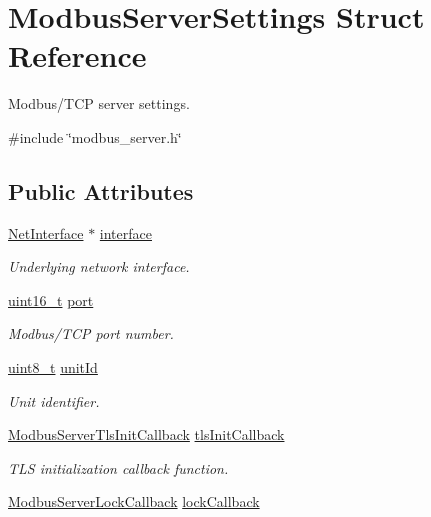 \hypertarget{structModbusServerSettings}{}\section{Modbus\+Server\+Settings Struct Reference}
\label{structModbusServerSettings}


Modbus/\+T\+CP server settings.  




{\ttfamily \#include \char`\"{}modbus\+\_\+server.\+h\char`\"{}}

\subsection*{Public Attributes}
\begin{DoxyCompactItemize}
\item 
\hyperlink{net_8h_a2234db8911a1148c9159979d8f5e0d6b}{Net\+Interface} $\ast$ \hyperlink{structModbusServerSettings_a8a5b5283989b576e26a24e970b70eb32}{interface}
\begin{DoxyCompactList}\small\item\em Underlying network interface. \end{DoxyCompactList}\item 
\hyperlink{stdint_8h_a273cf69d639a59973b6019625df33e30}{uint16\+\_\+t} \hyperlink{structModbusServerSettings_a0da7876580b2d9302e1d3a3b85ec9060}{port}
\begin{DoxyCompactList}\small\item\em Modbus/\+T\+CP port number. \end{DoxyCompactList}\item 
\hyperlink{stdint_8h_aba7bc1797add20fe3efdf37ced1182c5}{uint8\+\_\+t} \hyperlink{structModbusServerSettings_ad120c4c503d9d0a0c696393b6d1dd0c4}{unit\+Id}
\begin{DoxyCompactList}\small\item\em Unit identifier. \end{DoxyCompactList}\item 
\hyperlink{modbus__server_8h_adc1985b28525307a7cd3eeb66f61c949}{Modbus\+Server\+Tls\+Init\+Callback} \hyperlink{structModbusServerSettings_a47ec2e1ff36693be192539cd5543a742}{tls\+Init\+Callback}
\begin{DoxyCompactList}\small\item\em T\+LS initialization callback function. \end{DoxyCompactList}\item 
\hyperlink{modbus__server_8h_a81193c898fb5f09885891ee3d7bcda85}{Modbus\+Server\+Lock\+Callback} \hyperlink{structModbusServerSettings_ab5fc3a85c04473ffc6f99fd769c4030e}{lock\+Callback}

\end{DoxyCompactItemize}
